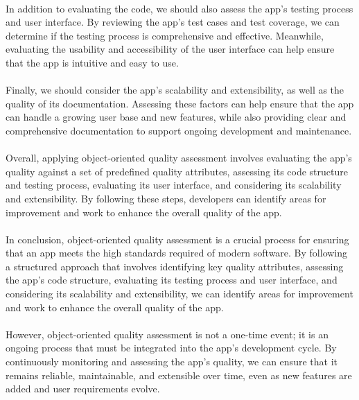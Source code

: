\paragraph{}
In addition to evaluating the code, we should also assess the app's testing process and user interface. By reviewing the app's test cases and test coverage, we can determine if the testing process is comprehensive and effective. Meanwhile, evaluating the usability and accessibility of the user interface can help ensure that the app is intuitive and easy to use.

\paragraph{}
Finally, we should consider the app's scalability and extensibility, as well as the quality of its documentation. Assessing these factors can help ensure that the app can handle a growing user base and new features, while also providing clear and comprehensive documentation to support ongoing development and maintenance.

\paragraph{}
Overall, applying object-oriented quality assessment involves evaluating the app's quality against a set of predefined quality attributes, assessing its code structure and testing process, evaluating its user interface, and considering its scalability and extensibility. By following these steps, developers can identify areas for improvement and work to enhance the overall quality of the app.

\paragraph{}
In conclusion, object-oriented quality assessment is a crucial process for ensuring that an app meets the high standards required of modern software. By following a structured approach that involves identifying key quality attributes, assessing the app's code structure, evaluating its testing process and user interface, and considering its scalability and extensibility, we can identify areas for improvement and work to enhance the overall quality of the app.

\paragraph{}
However, object-oriented quality assessment is not a one-time event; it is an ongoing process that must be integrated into the app's development cycle. By continuously monitoring and assessing the app's quality, we can ensure that it remains reliable, maintainable, and extensible over time, even as new features are added and user requirements evolve.


